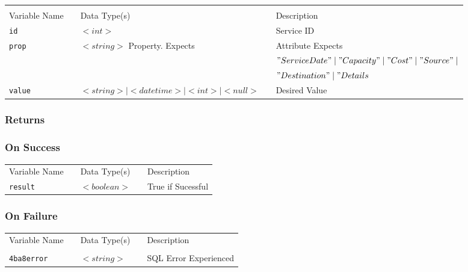 \begin{tabular}{lllll}
				&	&	&	&	\\
Variable Name	&		&	Data Type(s)		&	&	Description	\\
\verb!id! & \hspace{15mm} & $<int>$ & \hspace{15mm} & Service ID \\
\verb!prop! & \hspace{15mm} & $<string>$ Property. Expects
& \hspace{15mm} & Attribute  Expects \\
	&	&	&	&	$"ServiceDate" \mid "Capacity" \mid "Cost" \mid "Source" \mid $ \\
	&	&	&	&	$"Destination" \mid"Details$ \\
\verb!value! & \hspace{15mm} & $<string> \mid <datetime> \mid <int> \mid
<null>$  & \hspace{15mm} & Desired Value \\
\end{tabular}

\subsubsection{Returns}

\subsubsection{On Success}

\begin{tabular}{lllll}
Variable Name	&		&	Data Type(s)		&	&	Description	\\
\verb!result! & \hspace{15mm} & $<boolean>$ & \hspace{15mm} & True if Sucessful \\
\end{tabular}

\subsubsection{On Failure}

\begin{tabular}{lllll}
Variable Name	&		&	Data Type(s)		&	&	Description	\\
				&	&	&	&	\\
\verb!4ba8error! & \hspace{15mm} & $<string>$ & \hspace{15mm} & SQL Error Experienced \\
\end{tabular}


